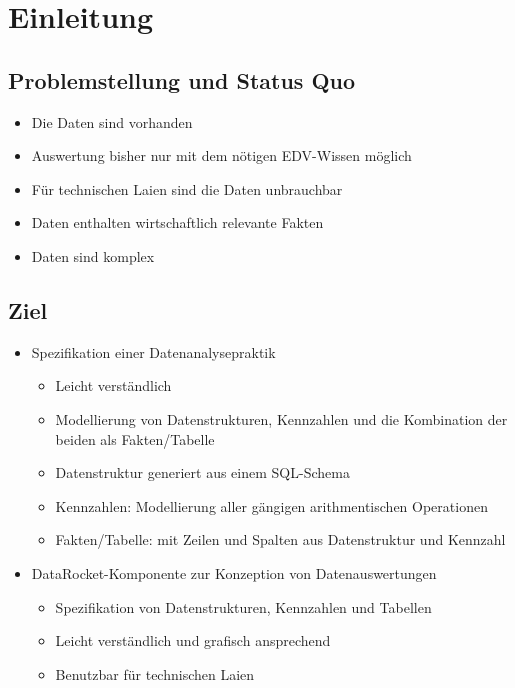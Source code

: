 \chapter{Einleitung}

\section{Problemstellung und Status Quo}
\begin{itemize}
  \item Die Daten sind vorhanden
  \item Auswertung bisher nur mit dem nötigen EDV-Wissen möglich
  \item Für technischen Laien sind die Daten unbrauchbar
  \item Daten enthalten wirtschaftlich relevante Fakten
  \item Daten sind komplex
\end{itemize}

\section{Ziel}
\begin{itemize}
\item Spezifikation einer Datenanalysepraktik
  \begin{itemize}
    \item Leicht verständlich
    \item Modellierung von Datenstrukturen, Kennzahlen und die Kombination der beiden als Fakten/Tabelle
    \item Datenstruktur generiert aus einem SQL-Schema
    \item Kennzahlen: Modellierung aller gängigen arithmentischen Operationen
    \item Fakten/Tabelle: mit Zeilen und Spalten aus Datenstruktur und Kennzahl 
  \end{itemize}
\item DataRocket-Komponente zur Konzeption von Datenauswertungen
  \begin{itemize}
    \item Spezifikation von Datenstrukturen, Kennzahlen und Tabellen
    \item Leicht verständlich und grafisch ansprechend
    \item Benutzbar für technischen Laien
  \end{itemize}
\end{itemize}
